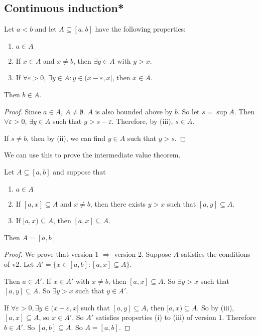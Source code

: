 \documentclass[a4paper]{article}
\begin{document}
\subsection{Continuous induction*}
\begin{prop}
  Let $a < b$ and let $A\subseteq [a, b]$ have the following properties:
  \begin{enumerate}
    \item $a\in A$
    \item If $x\in A$ and $x\not= b$, then $\exists y\in A$ with $y > x$.
    \item If $\forall \varepsilon > 0$, $\exists y\in A: y\in (x - \varepsilon, x]$, then $x\in A$.
  \end{enumerate}
  Then $b\in A$.
\end{prop}

\begin{proof}
  Since $a\in A$, $A\not= \emptyset$. $A$ is also bounded above by $b$. So let $s = \sup A$. Then $\forall \varepsilon > 0$, $\exists y\in A$ such that $y > s - \varepsilon$. Therefore, by (iii), $s\in A$.

  If $s\not= b$, then by (ii), we can find $y\in A$ such that $y > s$.
\end{proof}
We can use this to prove the intermediate value theorem.

\begin{prop}
  Let $A\subseteq [a, b]$ and suppose that
  \begin{enumerate}
    \item $a\in A$
    \item If $[a, x]\subseteq A$ and $x\not = b$, then there exists $y > x$ such that $[a, y]\subseteq A$.
    \item If $[a, x)\subseteq A$, then $[a, x]\subseteq A$.
  \end{enumerate}
  Then $A = [a, b]$
\end{prop}

\begin{proof}
  We prove that version 1 $\Rightarrow$ version 2.
  Suppose $A$ satisfies the conditions of v2. Let $A' = \{x\in [a, b]: [a, x]\subseteq A\}$.

  Then $a\in A'$. If $x\in A'$ with $x \not= b$, then $[a, x]\subseteq A$. So $\exists y > x$ such that $[a, y] \subseteq A$. So $\exists y > x$ such that $y\in A'$.

  If $\forall \varepsilon > 0, \exists y\in (x - \varepsilon, x]$ such that $[a, y]\subseteq A$, then $[a, x)\subseteq A$. So by (iii), $[a, x]\subseteq A$, so $x\in A'$. So $A'$ satisfies properties (i) to (iii) of version 1. Therefore $b\in A'$. So $[a, b]\subseteq A$. So $A = [a, b]$.
\end{proof}
\end{document}
